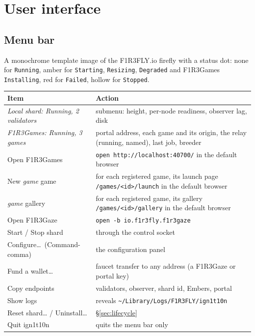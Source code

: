 \documentclass[11pt]{article}
\theoremstyle{definition}
\theoremstyle{remark}
\newcommand{\code}[1]{\texttt{#1}}
\newcommand{\Gz}{F1R3Gaze}
\newcommand{\Gm}{F1R3Games}
\newcommand{\Em}{Embers}
\begin{document}
\section{User interface}\label{sec:ui}

\subsection{Menu bar}
A monochrome template image of the F1R3FLY.io firefly with a status dot: none for
\code{Running}, amber for \code{Starting}, \code{Resizing}, \code{Degraded} and
\Gm{} \code{Installing}, red for \code{Failed}, hollow for \code{Stopped}.

\begin{center}\small
\begin{tabularx}{\linewidth}{@{}p{5.0cm}X@{}}
\toprule
Item & Action\\
\midrule
\textit{Local shard: Running, 2 validators} & submenu: height, per-node readiness, observer lag, disk\\
\textit{F1R3Games: Running, 3 games} & portal address, each game and its origin, the relay (running, named), last job, breeder\\
Open F1R3Games & \code{open http://localhost:40700/} in the default browser\\
\quad New \textit{game} game & for each registered game, its launch page \code{/games/<id>/launch} in the default browser\\
\quad \textit{game} gallery & for each registered game, its gallery \code{/games/<id>/gallery} in the default browser\\
Open F1R3Gaze & \code{open -b io.f1r3fly.f1r3gaze}\\
Start / Stop shard & through the control socket\\
Configure\ldots\ (Command-comma) & the configuration panel\\
Fund a wallet\ldots & faucet transfer to any address (a \Gz{} or portal key)\\
Copy endpoints & validators, observer, shard id, \Em{}, portal\\
Show logs & reveals \code{\textasciitilde/Library/Logs/F1R3FLY/ign1t10n}\\
Reset shard\ldots{} / Uninstall\ldots & \S\ref{sec:lifecycle}\\
Quit ign1t10n & quits the menu bar only\\
\bottomrule
\end{tabularx}
\end{center}
\end{document}
